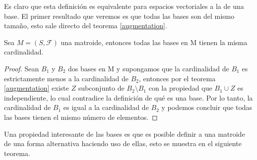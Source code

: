 Es claro que esta definición es equivalente para espacios vectoriales a la de una base. El primer resultado que veremos es que todas las bases son del mismo tamaño, esto sale directo del teorema \ref{augmentation}. 

\begin{cor} \label{cor bases}
Sea $M=(S,\mathcal{F})$ una matroide, entonces todas las bases en M tienen la misma cardinalidad.
\end{cor}
\begin{proof}
Sean $B_1$ y $B_2$ dos bases en M y supongamos que la cardinalidad de $B_1$ es estrictamente menos a la cardinalidad de $B_2$, entonces por el teorema \ref{augmentation} existe $Z$ subconjunto de $B_2 \setminus B_1$ con la propiedad que $B_1 \cup Z$ es independiente, lo cual contradice la definición de qué es una base. Por lo tanto, la cardinalidad de $B_1$ es igual a la cardinalidad de $B_2$ y podemos concluir que todas las bases tienen el mismo número de elementos. 
\end{proof}

Una propiedad interesante de las bases es que es posible definir a una matroide de una forma alternativa haciendo uso de ellas, esto se muestra en el siguiente teorema. 

